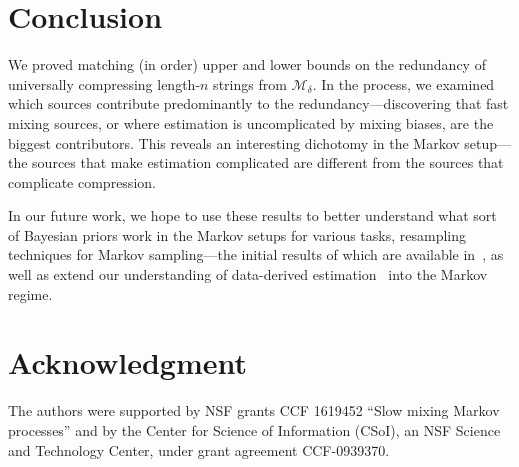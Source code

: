 \documentclass[conference,a4paper]{article}
\newcommand{\M}{\mathcal{M}}
\begin{document}
\section{Conclusion}
We proved matching (in order) upper and lower bounds on the redundancy
of universally compressing length-$n$ strings from $\M_\delta$. In the
process, we examined which sources contribute predominantly to the
redundancy---discovering that fast mixing sources, or where estimation
is uncomplicated by mixing biases, are the biggest contributors.  This
reveals an interesting dichotomy in the Markov setup---the sources
that make estimation complicated are different from the sources that
complicate compression.

In our future work, we hope to use these results to better understand
what sort of Bayesian priors work in the Markov setups for various
tasks, resampling techniques for Markov sampling---the initial results
of which are available in~\cite{oshiro2017jackknife}, as well as
extend our understanding of data-derived estimation~\cite{SA15:jmlr} into the
Markov regime.


\section*{Acknowledgment}
The authors were supported by NSF grants CCF 1619452 ``Slow mixing
Markov processes'' and by the Center for Science of Information
(CSoI), an NSF Science and Technology Center, under grant agreement
CCF-0939370.





%
%




\end{document}
